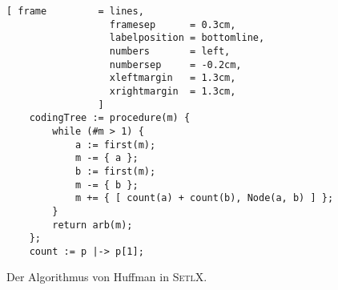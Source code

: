 \begin{figure}[!ht]
\centering
\begin{Verbatim}[ frame         = lines, 
                  framesep      = 0.3cm, 
                  labelposition = bottomline,
                  numbers       = left,
                  numbersep     = -0.2cm,
                  xleftmargin   = 1.3cm,
                  xrightmargin  = 1.3cm,
                ]
    codingTree := procedure(m) {
        while (#m > 1) {
            a := first(m);
            m -= { a };
            b := first(m);
            m -= { b };
            m += { [ count(a) + count(b), Node(a, b) ] };
        }
        return arb(m);
    };    
    count := p |-> p[1];
\end{Verbatim}
\vspace*{-0.3cm}
\caption{Der Algorithmus von Huffman in \textsc{SetlX}.}
\label{fig:huffman.stlx}
\end{figure} %

